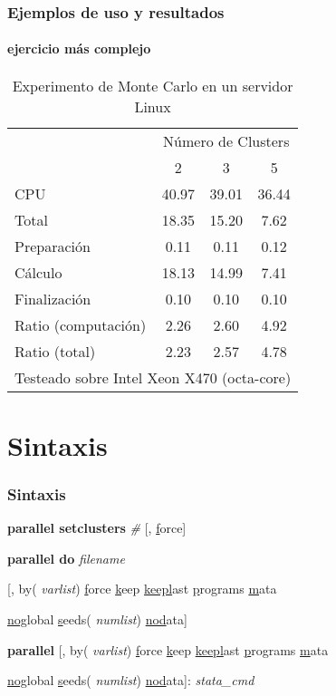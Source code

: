 \documentclass{beamer}
\def\unix1{Intel Xeon X470 (octa-core)}
\begin{document}
\begin{frame}
\frametitle{Ejemplos de uso y resultados}
\framesubtitle{ejercicio m\'as complejo}

\begin{table}[!h]
\centering
\caption{Experimento de Monte Carlo en un servidor Linux}
\begin{tabular}{l*{3}{c}}\hline
& \multicolumn{3}{c}{N\'umero de Clusters} \\
& 2 &               3 &               5 \\ \hline
CPU &    40.97 &     39.01 &     36.44 \\
Total &    18.35 &     15.20 &      7.62 \\
\hspace{2mm} Preparaci\'on &     0.11 &      0.11 &      0.12 \\
\hspace{2mm} C\'alculo &    18.13 &     14.99 &      7.41 \\
\hspace{2mm} Finalizaci\'on &     0.10 &      0.10 &      0.10 \\
\hline Ratio (computaci\'on) &     2.26 &      2.60 &      4.92 \\
Ratio (total) &     2.23 &      2.57 &      4.78 \\
\hline
\multicolumn{4}{c}{\footnotesize Testeado sobre \unix1}
\end{tabular}
\end{table}

\end{frame}

\section{Sintaxis}

\begin{frame}
\frametitle{Sintaxis}
\footnotesize
\begin{semiverbatim}
{\bf parallel setclusters} {\it \#}  [, \uline{f}orce] \pause

{\bf parallel do} {\it \color{blue} filename}

\hspace{1cm} [, by({\it \color{blue} varlist}) \uline{f}orce \uline{k}eep \uline{keepl}ast \uline{p}rograms \uline{m}ata 

\hspace{1cm} \uline{nog}lobal \uline{s}eeds({\it \color{blue} numlist}) \uline{nod}ata] \pause

{\bf parallel}  [, by({\it \color{blue} varlist}) \uline{f}orce \uline{k}eep \uline{keepl}ast \uline{p}rograms \uline{m}ata 

\hspace{1cm} \uline{nog}lobal \uline{s}eeds({\it \color{blue} numlist}) \uline{nod}ata]:  {\it stata\_cmd}
\end{semiverbatim}
\end{frame}
\end{document}
